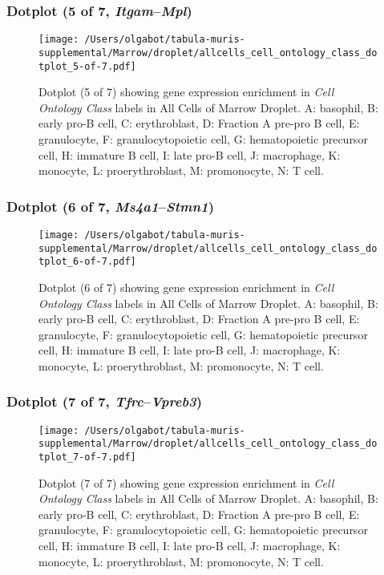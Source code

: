 \clearpage

\subsubsection{Dotplot (5 of 7, \emph{Itgam}--\emph{Mpl})}
\begin{figure}[h]
\centering
\texttt{[image: /Users/olgabot/tabula-muris-supplemental/Marrow/droplet/allcells\_cell\_ontology\_class\_dotplot\_5-of-7.pdf]}

\caption{ Dotplot (5 of 7)  showing gene expression enrichment in \emph{Cell Ontology Class} labels in All Cells of Marrow Droplet. A: basophil, B: early pro-B cell, C: erythroblast, D: Fraction A pre-pro B cell, E: granulocyte, F: granulocytopoietic cell, G: hematopoietic precursor cell, H: immature B cell, I: late pro-B cell, J: macrophage, K: monocyte, L: proerythroblast, M: promonocyte, N: T cell.}
\end{figure}


\clearpage

\subsubsection{Dotplot (6 of 7, \emph{Ms4a1}--\emph{Stmn1})}
\begin{figure}[h]
\centering
\texttt{[image: /Users/olgabot/tabula-muris-supplemental/Marrow/droplet/allcells\_cell\_ontology\_class\_dotplot\_6-of-7.pdf]}

\caption{ Dotplot (6 of 7)  showing gene expression enrichment in \emph{Cell Ontology Class} labels in All Cells of Marrow Droplet. A: basophil, B: early pro-B cell, C: erythroblast, D: Fraction A pre-pro B cell, E: granulocyte, F: granulocytopoietic cell, G: hematopoietic precursor cell, H: immature B cell, I: late pro-B cell, J: macrophage, K: monocyte, L: proerythroblast, M: promonocyte, N: T cell.}
\end{figure}


\clearpage

\subsubsection{Dotplot (7 of 7, \emph{Tfrc}--\emph{Vpreb3})}
\begin{figure}[h]
\centering
\texttt{[image: /Users/olgabot/tabula-muris-supplemental/Marrow/droplet/allcells\_cell\_ontology\_class\_dotplot\_7-of-7.pdf]}

\caption{ Dotplot (7 of 7)  showing gene expression enrichment in \emph{Cell Ontology Class} labels in All Cells of Marrow Droplet. A: basophil, B: early pro-B cell, C: erythroblast, D: Fraction A pre-pro B cell, E: granulocyte, F: granulocytopoietic cell, G: hematopoietic precursor cell, H: immature B cell, I: late pro-B cell, J: macrophage, K: monocyte, L: proerythroblast, M: promonocyte, N: T cell.}
\end{figure}


